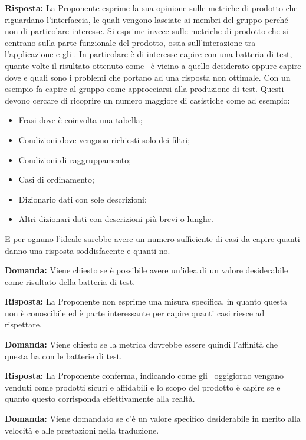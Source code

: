 \par \textbf{Risposta:} La Proponente esprime la sua opinione sulle metriche di prodotto che riguardano l'interfaccia, le quali vengono lasciate ai membri del gruppo perché non di particolare interesse.
Si esprime invece sulle metriche di prodotto che si centrano sulla parte funzionale del prodotto, ossia sull'interazione tra l'applicazione e gli . 
In particolare è di interesse capire con una batteria di test, quante volte il risultato ottenuto come \ è vicino a quello desiderato oppure capire dove e quali sono i problemi che portano ad una risposta non ottimale.
Con un esempio fa capire al gruppo come approcciarsi alla produzione di test. 
Questi devono cercare di ricoprire un numero maggiore di casistiche come ad esempio:
\begin{itemize}
	\item Frasi dove è coinvolta una tabella;
	\item Condizioni dove vengono richiesti solo dei filtri;
	\item Condizioni di raggruppamento;
	\item Casi di ordinamento;
	\item Dizionario dati con sole descrizioni;
	\item Altri dizionari dati con descrizioni più brevi o lunghe.
\end{itemize}
E per ognuno l'ideale sarebbe avere un numero sufficiente di casi da capire quanti danno una risposta soddisfacente e quanti no.

\par \textbf{Domanda:} Viene chiesto se è possibile avere un'idea di un valore desiderabile come risultato della batteria di test.

\par \textbf{Risposta:} La Proponente non esprime una misura specifica, in quanto questa non è conoscibile ed è parte interessante per capire quanti casi riesce ad rispettare.

\par \textbf{Domanda:} Viene chiesto se la metrica dovrebbe essere quindi l'affinità che questa ha con le batterie di test.

\par \textbf{Risposta:} La Proponente conferma, indicando come gli \ oggigiorno vengano venduti come prodotti sicuri e affidabili e lo scopo del prodotto è capire se e quanto questo corrisponda effettivamente alla realtà.

\par \textbf{Domanda:} Viene domandato se c'è un valore specifico desiderabile in merito alla velocità e alle prestazioni nella traduzione.

